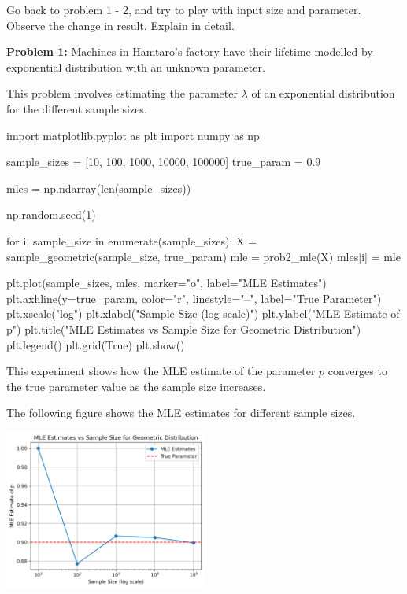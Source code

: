 \documentclass[a4paper, 10pt]{article}
\begin{document}
\newpage

\begin{problem}
Go back to problem 1 - 2, and try to play with input size and parameter.
Observe the change in result.
Explain in detail.
\end{problem}

\begin{subproblems}
    \item \textbf{Problem 1: } Machines in Hamtaro's factory have their lifetime modelled by exponential distribution with an unknown parameter.
\end{subproblems}

\begin{solution}
This problem involves estimating the parameter \( \lambda \) of an exponential distribution for the different sample sizes.
\begin{codingbox}
import matplotlib.pyplot as plt
import numpy as np

sample_sizes = [10, 100, 1000, 10000, 100000]
true_param = 0.9

mles = np.ndarray(len(sample_sizes))

np.random.seed(1)

for i, sample_size in enumerate(sample_sizes):
    X = sample_geometric(sample_size, true_param)
    mle = prob2_mle(X)
    mles[i] = mle

plt.plot(sample_sizes, mles, marker="o", label="MLE Estimates")
plt.axhline(y=true_param, color="r", linestyle="--", label="True Parameter")
plt.xscale("log")
plt.xlabel("Sample Size (log scale)")
plt.ylabel("MLE Estimate of p")
plt.title("MLE Estimates vs Sample Size for Geometric Distribution")
plt.legend()
plt.grid(True)
plt.show()
\end{codingbox}

This experiment shows how the MLE estimate of the parameter \( p \) converges to the true parameter value as the sample size increases.

\vspace{3mm}

The following figure shows the MLE estimates for different sample sizes.
\begin{center}
    \includegraphics[width=0.5\textwidth]{images/problem_7_1.png}
\end{center}
\end{solution}
\end{document}
